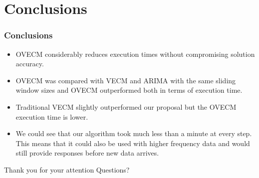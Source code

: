 \documentclass[xcolor=dvipsnames]{beamer}
\begin{document}

\section{Conclusions}
\begin{frame}
\frametitle{Conclusions}
\begin{itemize}
\item  OVECM considerably reduces execution times
without compromising solution accuracy.  
\item OVECM was compared with VECM and ARIMA
with the same sliding window sizes and OVECM outperformed both in terms of
execution time. 
\item Traditional VECM slightly outperformed our proposal but the
OVECM execution time is lower.
\item We could see that our algorithm took much less than a minute at every
step. This means that it could also be used with higher frequency data and would
still provide responses before new data arrives.  
\end{itemize}
\end{frame}

\begin{frame}[plain,c]

\begin{center}
\Huge Thank you for your attention
\Huge Questions?
\end{center}

\end{frame}
\end{document}

